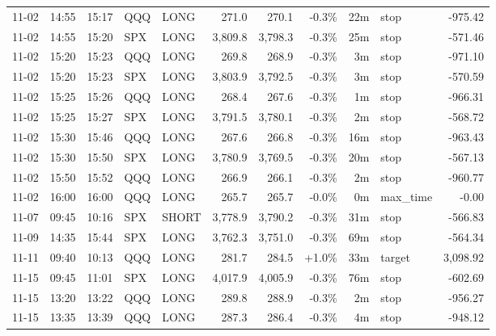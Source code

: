 \documentclass[11pt,a4paper,twoside]{article}
\begin{document}
\begin{center}
\begin{longtable}{>{\color{txtmain}}l l l l l r r r r >{\color{txtmain}}l r}
11-02 & 14:55 & 15:17 & QQQ & LONG & 271.0 & 270.1 & \textcolor{lossred}{-0.3\%} & 22m & stop & \textcolor{lossred}{-975.42} \\
11-02 & 14:55 & 15:20 & SPX & LONG & 3,809.8 & 3,798.3 & \textcolor{lossred}{-0.3\%} & 25m & stop & \textcolor{lossred}{-571.46} \\
11-02 & 15:20 & 15:23 & QQQ & LONG & 269.8 & 268.9 & \textcolor{lossred}{-0.3\%} & 3m & stop & \textcolor{lossred}{-971.10} \\
11-02 & 15:20 & 15:23 & SPX & LONG & 3,803.9 & 3,792.5 & \textcolor{lossred}{-0.3\%} & 3m & stop & \textcolor{lossred}{-570.59} \\
11-02 & 15:25 & 15:26 & QQQ & LONG & 268.4 & 267.6 & \textcolor{lossred}{-0.3\%} & 1m & stop & \textcolor{lossred}{-966.31} \\
11-02 & 15:25 & 15:27 & SPX & LONG & 3,791.5 & 3,780.1 & \textcolor{lossred}{-0.3\%} & 2m & stop & \textcolor{lossred}{-568.72} \\
11-02 & 15:30 & 15:46 & QQQ & LONG & 267.6 & 266.8 & \textcolor{lossred}{-0.3\%} & 16m & stop & \textcolor{lossred}{-963.43} \\
11-02 & 15:30 & 15:50 & SPX & LONG & 3,780.9 & 3,769.5 & \textcolor{lossred}{-0.3\%} & 20m & stop & \textcolor{lossred}{-567.13} \\
11-02 & 15:50 & 15:52 & QQQ & LONG & 266.9 & 266.1 & \textcolor{lossred}{-0.3\%} & 2m & stop & \textcolor{lossred}{-960.77} \\
11-02 & 16:00 & 16:00 & QQQ & LONG & 265.7 & 265.7 & \textcolor{lossred}{-0.0\%} & 0m & max\_time & \textcolor{lossred}{-0.00} \\
11-07 & 09:45 & 10:16 & SPX & SHORT & 3,778.9 & 3,790.2 & \textcolor{lossred}{-0.3\%} & 31m & stop & \textcolor{lossred}{-566.83} \\
11-09 & 14:35 & 15:44 & SPX & LONG & 3,762.3 & 3,751.0 & \textcolor{lossred}{-0.3\%} & 69m & stop & \textcolor{lossred}{-564.34} \\
11-11 & 09:40 & 10:13 & QQQ & LONG & 281.7 & 284.5 & \textcolor{wingreen}{+1.0\%} & 33m & target & \textcolor{wingreen}{3,098.92} \\
11-15 & 09:45 & 11:01 & SPX & LONG & 4,017.9 & 4,005.9 & \textcolor{lossred}{-0.3\%} & 76m & stop & \textcolor{lossred}{-602.69} \\
11-15 & 13:20 & 13:22 & QQQ & LONG & 289.8 & 288.9 & \textcolor{lossred}{-0.3\%} & 2m & stop & \textcolor{lossred}{-956.27} \\
11-15 & 13:35 & 13:39 & QQQ & LONG & 287.3 & 286.4 & \textcolor{lossred}{-0.3\%} & 4m & stop & \textcolor{lossred}{-948.12} \\

\end{longtable}
\end{center}
\end{document}
